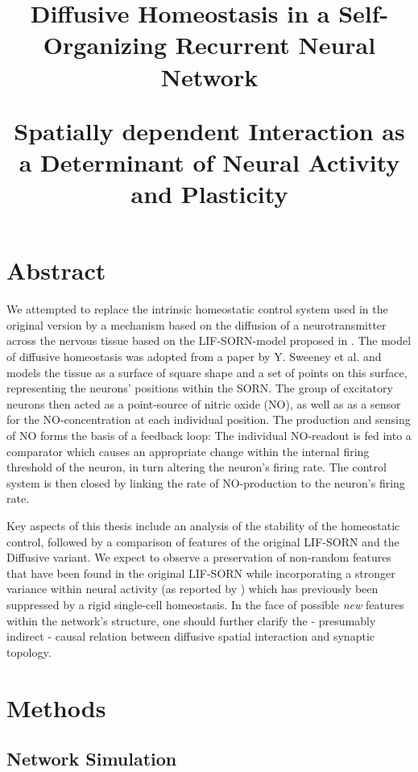 \documentclass[10pt,a4paper]{article}
\title{Diffusive Homeostasis in a Self-Organizing Recurrent Neural Network \\
\begin{large}
Spatially dependent Interaction as a Determinant of Neural Activity and Plasticity
\end{large}
}
\begin{document}
\maketitle
\section{Abstract} \label{abstract}
We attempted to replace the intrinsic homeostatic control system used in the original version by a mechanism based on the diffusion of a neurotransmitter across the nervous tissue based on the LIF-SORN-model proposed in \cite{SORN_Paper}. The model of diffusive homeostasis was adopted from a paper by Y. Sweeney et al. \cite{Sweeney_Paper} and models the tissue as a surface of square shape and a set of points on this surface, representing the neurons' positions within the SORN. The group of excitatory neurons then acted as a point-source of nitric oxide (NO), as well as as a sensor for the NO-concentration at each individual position. The production and sensing of NO forms the basis of a feedback loop: The individual NO-readout is fed into a comparator which causes an appropriate change within the internal firing threshold of the neuron, in turn altering the neuron's firing rate. The control system is then closed by linking the rate of NO-production to the neuron's firing rate.

Key aspects of this thesis include an analysis of the stability of the homeostatic control, followed by a comparison of features of the original LIF-SORN and the Diffusive variant. We expect to observe a preservation of non-random features that have been found in the original LIF-SORN while incorporating a stronger variance within neural activity (as reported by \cite{Sweeney_Paper}) which has previously been suppressed by a rigid single-cell homeostasis. In the face of possible \emph{new} features within the network's structure, one should further clarify the - presumably indirect - causal relation between diffusive spatial interaction and synaptic topology. 





\section{Methods} \label{methods}
\subsection{Network Simulation}
\end{document}

